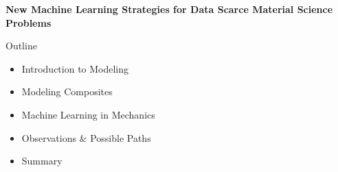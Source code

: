 \documentclass[aspectratio=169]{beamer}
\author{\authorlabel}
\newcommand{\mysubtitle}{\color{Pink}\Large{\textbf{New Machine Learning Strategies for Data Scarce Material Science Problems}}}
\begin{document}


\begin{frame}
  \centering
  \mysubtitle
\end{frame}

\begin{frame}{Outline}
  \centering
  \begin{itemize}
    \item Introduction to Modeling
    \item Modeling Composites
    \item Machine Learning in Mechanics
    \item Observations \& Possible Paths
    \item Summary
  \end{itemize}
\end{frame}




\end{document}
